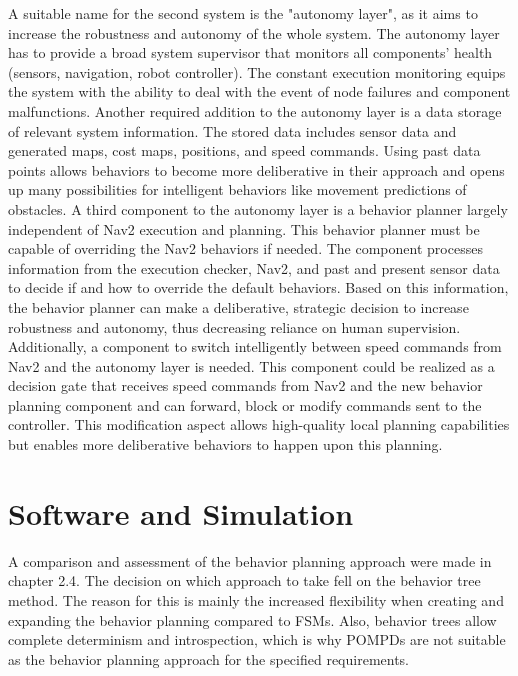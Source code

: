 A suitable name for the second system is the "autonomy layer", as it aims to increase the robustness and autonomy of the whole system. 
The autonomy layer has to provide a broad system supervisor that monitors all components' health (sensors, navigation, robot controller). The constant execution monitoring equips the system with the ability to deal with the event of node failures and component malfunctions. 
Another required addition to the autonomy layer is a data storage of relevant system information. The stored data includes sensor data and generated maps, cost maps, positions, and speed commands. Using past data points allows behaviors to become more deliberative in their approach and opens up many possibilities for intelligent behaviors like movement predictions of obstacles. 
A third component to the autonomy layer is a behavior planner largely independent of Nav2 execution and planning. This behavior planner must be capable of overriding the Nav2 behaviors if needed. The component processes information from the execution checker, Nav2, and past and present sensor data to decide if and how to override the default behaviors. Based on this information, the behavior planner can make a deliberative, strategic decision to increase robustness and autonomy, thus decreasing reliance on human supervision.
Additionally, a component to switch intelligently between speed commands from Nav2 and the autonomy layer is needed. This component could be realized as a decision gate that receives speed commands from Nav2 and the new behavior planning component and can forward, block or modify commands sent to the controller. This modification aspect allows high-quality local planning capabilities but enables more deliberative behaviors to happen upon this planning.


\section{Software and Simulation}
A comparison and assessment of the behavior planning approach were made in chapter 2.4. The decision on which approach to take fell on the behavior tree method. The reason for this is mainly the increased flexibility when creating and expanding the behavior planning compared to FSMs. Also, behavior trees allow complete determinism and introspection, which is why POMPDs are not suitable as the behavior planning approach for the specified requirements. 

